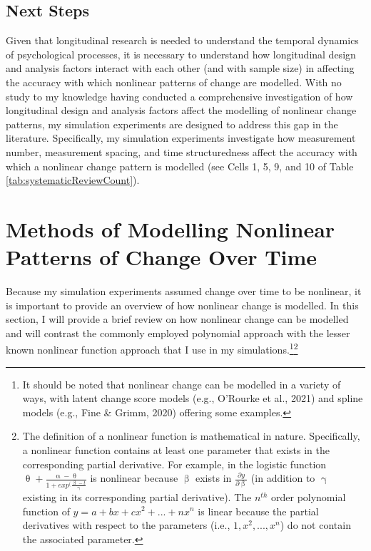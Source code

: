 \documentclass[
12pt, %
twoside,
english]{guelphthesis}
\theoremstyle{definition}
\theoremstyle{definition}
\theoremstyle{definition}
\theoremstyle{definition}
\theoremstyle{remark}
\begin{document}
\hypertarget{next-steps}{%
\subsection{Next Steps}\label{next-steps}}

Given that longitudinal research is needed to understand the temporal dynamics of psychological processes, it is necessary to understand how longitudinal design and analysis factors interact with each other (and with sample size) in affecting the accuracy with which nonlinear patterns of change are modelled. With no study to my knowledge having conducted a comprehensive investigation of how longitudinal design and analysis factors affect the modelling of nonlinear change patterns, my simulation experiments are designed to address this gap in the literature. Specifically, my simulation experiments investigate how measurement number, measurement spacing, and time structuredness affect the accuracy with which a nonlinear change pattern is modelled (see Cells 1, 5, 9, and 10 of Table \ref{tab:systematicReviewCount}).

\hypertarget{methods-of-modelling-nonlinear-patterns-of-change-over-time}{%
\section{Methods of Modelling Nonlinear Patterns of Change Over Time}\label{methods-of-modelling-nonlinear-patterns-of-change-over-time}}




Because my simulation experiments assumed change over time to be nonlinear, it is important to provide an overview of how nonlinear change is modelled. In this section, I will provide a brief review on how nonlinear change can be modelled and will contrast the commonly employed polynomial approach with the lesser known nonlinear function approach that I use in my simulations.\footnote{It should be noted that nonlinear change can be modelled in a variety of ways, with latent change score models (e.g., O'Rourke et al., 2021) and spline models (e.g., Fine \& Grimm, 2020) offering some examples.}\footnote{The definition of a nonlinear function is mathematical in nature. Specifically, a nonlinear function contains at least one parameter that exists in the corresponding partial derivative. For example, in the logistic function $\uptheta + \frac{\upalpha - \uptheta}{1 + exp^(\frac{\upbeta - t}{\upgamma}}$ is nonlinear because $\upbeta$ exists in $\frac{\partial y}{\partial \upbeta}$ (in addition to $\upgamma$ existing in its corresponding partial derivative). The $n^{th}$ order polynomial function of $y = a + bx + cx^2 + ... + nx^n$ is linear because  the partial derivatives with respect to the parameters (i.e., $1, x^2, ..., x^n$) do not contain the associated parameter.}
\end{document}
